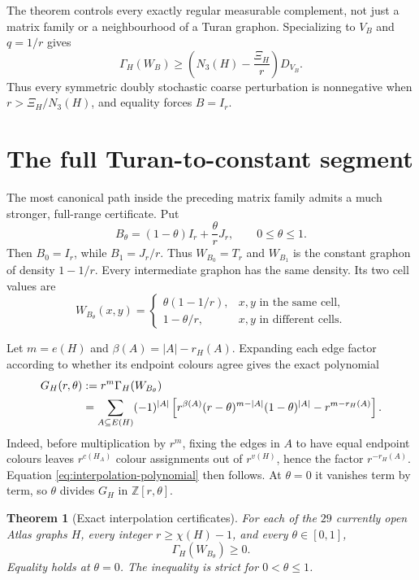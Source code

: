 \documentclass[11pt]{article}
\newtheorem{theorem}{Theorem}[section]
\begin{document}
The theorem controls every exactly regular measurable complement, not just
a matrix family or a neighbourhood of a Turan graphon.  Specializing to
$V_B$ and $q=1/r$ gives
\begin{equation}
 \Gamma_H(W_B)\geq
 \left(N_3(H)-\frac{\Xi_H}{r}\right)D_{V_B}.
 \label{eq:block-bound}
\end{equation}
Thus every symmetric doubly stochastic coarse perturbation is nonnegative
when $r>\Xi_H/N_3(H)$, and equality forces $B=I_r$.

\section{The full Turan-to-constant segment}

The most canonical path inside the preceding matrix family admits a much
stronger, full-range certificate.  Put
\[
 B_\theta=(1-\theta)I_r+\frac{\theta}{r}J_r,
 \qquad 0\leq\theta\leq1.
\]
Then $B_0=I_r$, while $B_1=J_r/r$.  Thus $W_{B_0}=T_r$ and
$W_{B_1}$ is the constant graphon of density $1-1/r$.  Every intermediate
graphon has the same density.  Its two cell values are
\[
 W_{B_\theta}(x,y)=
 \begin{cases}
  \theta(1-1/r),&x,y\text{ in the same cell},\\
  1-\theta/r,&x,y\text{ in different cells}.
 \end{cases}
\]

Let $m=e(H)$ and $\beta(A)=|A|-r_H(A)$.  Expanding each edge factor according
to whether its endpoint colours agree gives the exact polynomial
\begin{align}
 G_H(r,\theta)
 &:=r^m\Gamma_H(W_{B_\theta}) \notag\\
 &=\sum_{A\subseteq E(H)}(-1)^{|A|}
 \left[
 r^{\beta(A)}(r-\theta)^{m-|A|}(1-\theta)^{|A|}
 -r^{m-r_H(A)}
 \right].
 \label{eq:interpolation-polynomial}
\end{align}
Indeed, before multiplication by $r^m$, fixing the edges in $A$ to have
equal endpoint colours leaves $r^{c(H_A)}$ colour assignments out of
$r^{v(H)}$, hence the factor $r^{-r_H(A)}$.  Equation
\eqref{eq:interpolation-polynomial} then follows.  At $\theta=0$ it vanishes
term by term, so $\theta$ divides $G_H$ in $\mathbb Z[r,\theta]$.

\begin{theorem}[Exact interpolation certificates]
\label{thm:interpolation}
For each of the $29$ currently open Atlas graphs $H$, every integer
$r\geq\chi(H)-1$, and every $\theta\in[0,1]$,
\[
 \Gamma_H(W_{B_\theta})\geq0.
\]
Equality holds at $\theta=0$.  The inequality is strict for
$0<\theta\leq1$.
\end{theorem}
\end{document}
